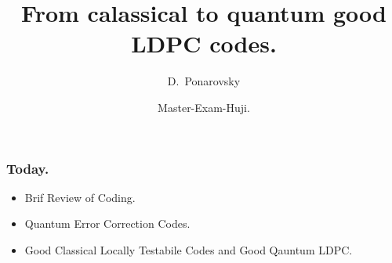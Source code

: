 \documentclass[usenames, aspectratio=169]{beamer}
\title[From calassical to quantum good LDPC codes.] %
{From calassical to quantum good LDPC codes.}
\subtitle{  }
\author[D.~Ponarovsky] %
	{D.~Ponarovsky\inst{1}}
\institute[HUJI] %
{  Faculty of Computer Science\newline
  Hebrew University of Jerusalem
}
\date[2023] %
{Master-Exam-Huji.}
\newcommand{\pslsq}[4]{
\begin{frame}
    \frametitle{#1} 
    \texttt{[image: \#3]}
    #4  
  \end{frame}
}
\begin{document}



\begin{frame}
  \maketitle
\end{frame}

\begin{frame}
  \frametitle{ Today. }
  \begin{itemize}
    \item<1-> Brif Review of Coding. 
    \item<2-> Quantum Error Correction Codes.
    \item<3->Good Classical Locally Testabile Codes and Good Qauntum LDPC.
  \end{itemize} 
\end{frame}
\end{document}
